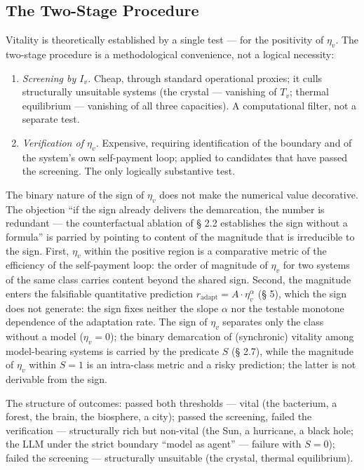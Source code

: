 \documentclass[pdflatex,sn-mathphys-ay]{sn-jnl}
\providecommand{\tightlist}{\setlength{\itemsep}{0pt}\setlength{\parskip}{0pt}}
\begin{document}
\subsection{The Two-Stage Procedure}\label{the-two-stage-procedure}

Vitality is theoretically established by a single test --- for the positivity of \(\eta_v\). The two-stage procedure is a methodological convenience, not a logical necessity:

\begin{enumerate}
\def\labelenumi{\arabic{enumi}.}
\tightlist
\item
  \emph{Screening by \(I_v\).} Cheap, through standard operational proxies; it culls structurally unsuitable systems (the crystal --- vanishing of \(T_v\); thermal equilibrium --- vanishing of all three capacities). A computational filter, not a separate test.
\item
  \emph{Verification of \(\eta_v\).} Expensive, requiring identification of the boundary and of the system's own self-payment loop; applied to candidates that have passed the screening. The only logically substantive test.
\end{enumerate}

The binary nature of the sign of \(\eta_v\) does not make the numerical value decorative. The objection ``if the sign already delivers the demarcation, the number is redundant --- the counterfactual ablation of § 2.2 establishes the sign without a formula'' is parried by pointing to content of the magnitude that is irreducible to the sign. First, \(\eta_v\) within the positive region is a comparative metric of the efficiency of the self-payment loop: the order of magnitude of \(\eta_v\) for two systems of the same class carries content beyond the shared sign. Second, the magnitude enters the falsifiable quantitative prediction \(r_{\text{adapt}} = A \cdot \eta_v^{\alpha}\) (§ 5), which the sign does not generate: the sign fixes neither the slope \(\alpha\) nor the testable monotone dependence of the adaptation rate. The sign of \(\eta_v\) separates only the class without a model (\(\eta_v = 0\)); the binary demarcation of (synchronic) vitality among model-bearing systems is carried by the predicate \(S\) (§ 2.7), while the magnitude of \(\eta_v\) within \(S = 1\) is an intra-class metric and a risky prediction; the latter is not derivable from the sign.

The structure of outcomes: passed both thresholds --- vital (the bacterium, a forest, the brain, the biosphere, a city); passed the screening, failed the verification --- structurally rich but non-vital (the Sun, a hurricane, a black hole; the LLM under the strict boundary ``model as agent'' --- failure with \(S = 0\)); failed the screening --- structurally unsuitable (the crystal, thermal equilibrium).
\end{document}

